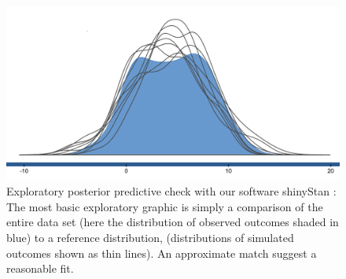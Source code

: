 \documentclass[11pt,notitlepage]{article}
\begin{document}
\begin{figure} 
 \vspace{-20pt}
 \includegraphics[scale=0.2]{Figures/posteriorpredictivecheck.png} 
  \caption{\footnotesize Exploratory posterior predictive check with our software shinyStan \cite{shinystan-software:2015}: The most basic exploratory graphic \cite{Gelman2004posteriorpredictivechecks} is simply a comparison of the entire data set (here the distribution of observed outcomes shaded in blue) to a reference distribution, (distributions of simulated outcomes shown as thin lines). An approximate match suggest a reasonable fit.}
  \label{fig:posteriorpredictivecheck}
  \vspace{-20pt}
\end{figure}
\end{document}
